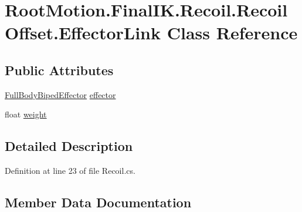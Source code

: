 \hypertarget{class_root_motion_1_1_final_i_k_1_1_recoil_1_1_recoil_offset_1_1_effector_link}{}\section{Root\+Motion.\+Final\+I\+K.\+Recoil.\+Recoil\+Offset.\+Effector\+Link Class Reference}
\label{class_root_motion_1_1_final_i_k_1_1_recoil_1_1_recoil_offset_1_1_effector_link}
\subsection*{Public Attributes}
\begin{DoxyCompactItemize}
\item 
\mbox{\hyperlink{namespace_root_motion_1_1_final_i_k_ae0dd2058c7667b6f132c11a6b860c14a}{Full\+Body\+Biped\+Effector}} \mbox{\hyperlink{class_root_motion_1_1_final_i_k_1_1_recoil_1_1_recoil_offset_1_1_effector_link_a821fd5c901b411339deb723a45fd0db4}{effector}}
\item 
float \mbox{\hyperlink{class_root_motion_1_1_final_i_k_1_1_recoil_1_1_recoil_offset_1_1_effector_link_a70cfbea6d66d9cb118a930ef8498f4ab}{weight}}
\end{DoxyCompactItemize}


\subsection{Detailed Description}


Definition at line 23 of file Recoil.\+cs.



\subsection{Member Data Documentation}
\mbox{\label{class_root_motion_1_1_final_i_k_1_1_recoil_1_1_recoil_offset_1_1_effector_link_a821fd5c901b411339deb723a45fd0db4}} 
